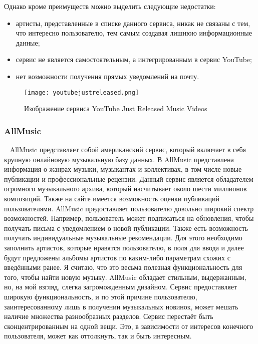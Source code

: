 Однако кроме преимуществ можно выделить следующие недостатки:

\begin{itemize}
  \item артисты, представленные в списке данного сервиса, никак не связаны с тем, что интересно пользователю, тем самым создавая лишнюю информационные данные;
  \item сервис не является самостоятельным, а интегрированным в сервис YouTube;
  \item нет возможности получения прямых уведомлений на почту.
\end{itemize}

\begin{figure}[ht]
\centering
  \texttt{[image: youtubejustreleased.png]}
  \caption{ Изображение сервиса YouTube Just Released Music Videos }
  \label{fig:domain:youtube_just_released_music_videos:picture}
\end{figure}

\subsubsection{AllMusic}
\label{sub:domain:analogues_review:allmusic}
~\newline
\indent AllMusic представляет собой американский сервис, который включает в себя крупную онлайновую музыкальную базу данных. В AllMusic представлена информация о жанрах музыки, музыкантах и коллективах, в том числе новые публикации и профессиональные рецензии. Данный сервис является обладателем огромного музыкального архива, который насчитывает около шести миллионов композиций. Также на сайте имеется возможность оценки публикаций пользователями.
AllMusic предоставляет пользователю довольно широкий спектр возможностей. Например, пользователь может подписаться на обновления, чтобы получать письма с уведомлением о новой публикации. Также есть возможность получать индивидуальные музыкальные рекомендации. Для этого необходимо заполнить артистов, которые нравятся пользователю, в поля для ввода и далее будут предложены альбомы артистов по каким-либо параметрам схожих с введёнными ранее. Я считаю, что это весьма полезная функциональность для того, чтобы найти новую музыку.
AllMusic обладает стильным, выдержанным, но, на мой взгляд, слегка загроможденным дизайном. Сервис предоставляет широкую функциональность, и по этой причине пользователю, заинтересованному лишь в получении музыкальных новинок, может мешать наличие множества разнообразных разделов. Сервис перестаёт быть сконцентрированным на одной вещи. Это, в зависимости от интересов конечного пользователя, может как оттолкнуть, так и быть интересным.


